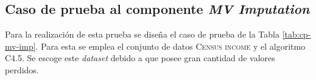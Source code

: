 \subsection{Caso de prueba al componente \textit{MV Imputation}}
Para la realización de esta prueba se diseña el caso de prueba de la Tabla \ref{tab:cp-mv-imp}. Para esta se emplea el conjunto de datos \textsc{Census income} y el algoritmo C4.5. Se escoge este \textit{dataset} debido a que posee gran cantidad de valores perdidos.

\begin{table}[H]
	\centering
	\caption{Caso de prueba al componente \textit{MV Imputation}}
	\label{tab:cp-mv-imp}
	\begin{spacing}{1.15}
\end{spacing}
\end{table}
